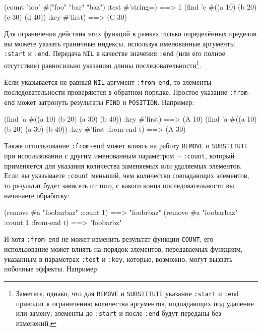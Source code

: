 \begin{myverb}
(count "foo" #("foo" "bar" "baz") :test #'string=)    ==> 1
(find 'c #((a 10) (b 20) (c 30) (d 40)) :key #'first) ==> (C 30)
\end{myverb}

Для ограничения действия этих функций в рамках только определённых пределов вы можете
указать граничные индексы, используя именованные аргументы \lstinline{:start} и \lstinline{:end}.
Передача \lstinline{NIL} в качестве значения \lstinline{:end} (или его полное отсутствие)
равносильно указанию длины последовательности\footnote{Заметьте, однако, что для
  \lstinline{REMOVE} и \lstinline{SUBSTITUTE} указание \lstinline{:start} и \lstinline{:end} приводит к
  ограничению количества аргументов, подпадающих под удаление или замену; элементы до
  \lstinline{:start} и после \lstinline{:end} будут переданы без изменений.}.

Если указывается не равный \lstinline{NIL} аргумент \lstinline{:from-end}, то элементы
последовательности проверяются в обратном порядке.  Простое указание \lstinline{:from-end}
может затронуть результаты \lstinline{FIND} и \lstinline{POSITION}.  Например:

\begin{myverb}
(find 'a #((a 10) (b 20) (a 30) (b 40)) :key #'first)             ==> (A 10)
(find 'a #((a 10) (b 20) (a 30) (b 40)) :key #'first :from-end t) ==> (A 30)
\end{myverb}

Также использование \lstinline{:from-end} может влиять на работу \lstinline{REMOVE} и
\lstinline{SUBSTITUTE} при использовании с другим именованным параметром~-- \lstinline{:count},
который применяется для указания количества заменяемых или удаляемых элементов.  Если вы
указываете \lstinline{:count} меньший, чем количество совпадающих элементов, то результат будет
зависеть от того, с какого конца последовательности вы начинаете обработку:

\begin{myverb}
(remove #\bslash{}a "foobarbaz" :count 1)             ==> "foobrbaz"
(remove #\bslash{}a "foobarbaz" :count 1 :from-end t) ==> "foobarbz"
\end{myverb}

И хотя \lstinline{:from-end} не может изменить результат функции \lstinline{COUNT}, его
использование может влиять на порядок элементов, передаваемых функциям, указанным в
параметрах \lstinline{:test} и \lstinline{:key}, которые, возможно, могут вызвать побочные эффекты.
Например:

